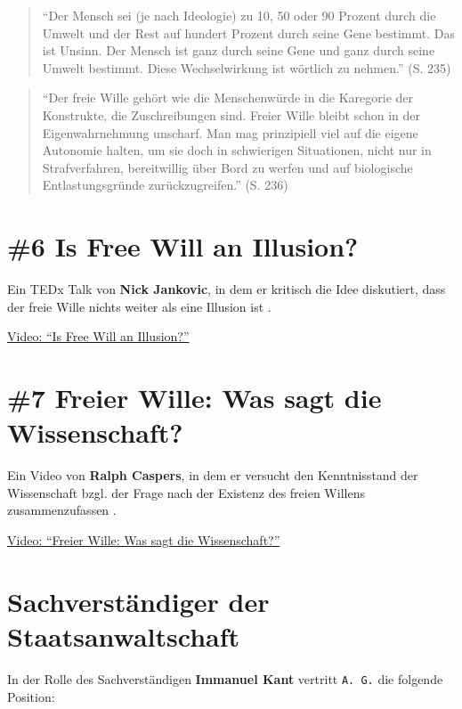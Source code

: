 \documentclass[
  a4paper,
]{report}
\begin{document}
\begin{quote}
``Der Mensch sei (je nach Ideologie) zu 10, 50 oder 90 Prozent durch die Umwelt und der Rest auf hundert Prozent durch seine Gene bestimmt. Das ist Unsinn. Der Mensch ist ganz durch seine Gene und ganz durch seine Umwelt bestimmt. Diese Wechselwirkung ist wörtlich zu nehmen.'' (S. 235)
\end{quote}

\begin{quote}
``Der freie Wille gehört wie die Menschenwürde in die Karegorie der Konstrukte, die Zuschreibungen sind. Freier Wille bleibt schon in der Eigenwahrnehmung unscharf. Man mag prinzipiell viel auf die eigene Autonomie halten, um sie doch in schwierigen Situationen, nicht nur in Strafverfahren, bereitwillig über Bord zu werfen und auf biologische Entlastungsgründe zurückzugreifen.'' (S. 236)
\end{quote}

\hypertarget{pr-ev6}{%
\section{\#6 Is Free Will an Illusion?}\label{pr-ev6}}

Ein TEDx Talk von \textbf{Nick Jankovic}, in dem er kritisch die Idee diskutiert, dass der freie Wille nichts weiter als eine Illusion ist \citep{Jankovic2021}.

\href{https://www.youtube.com/watch?v=J21bSGGvnD4}{Video: ``Is Free Will an Illusion?''}

\hypertarget{pr-ev7}{%
\section{\#7 Freier Wille: Was sagt die Wissenschaft?}\label{pr-ev7}}

Ein Video von \textbf{Ralph Caspers}, in dem er versucht den Kenntnisstand der Wissenschaft bzgl. der Frage nach der Existenz des freien Willens zusammenzufassen \citep{Caspers2021}.

\href{https://www.youtube.com/watch?v=45Iut50Cm_Q}{Video: ``Freier Wille: Was sagt die Wissenschaft?''}

\hypertarget{pr-expert}{%
\section{Sachverständiger der Staatsanwaltschaft}\label{pr-expert}}

In der Rolle des Sachverständigen \textbf{Immanuel Kant} vertritt \texttt{A.\ G.} die folgende Position:
\end{document}
